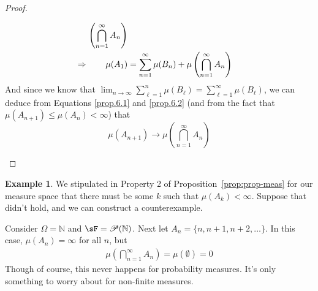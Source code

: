 \documentclass[12pt]{article}
\theoremstyle{plain}
\theoremstyle{definition}
\newtheorem{ex}[thm]{Example}
\theoremstyle{remark}
\begin{document}
\begin{proof}
\begin{enumerate}
\begin{align}
            \left(\bigcap^\infty_{n=1} A_n\right) \notag \\
        \Rightarrow \qquad
            \mu(A_1) &=
            \sum^\infty_{n=1} \mu(B_n) +
            \mu\left(\bigcap^\infty_{n=1} A_n\right)
            \label{prop.6.2}
    \end{align}
    And since we know that $\lim_{n\rightarrow \infty} \sum^n_{\ell=1}
    \mu(B_\ell) = \sum^\infty_{\ell=1} \mu(B_\ell)$, we can deduce from
    Equations \ref{prop.6.1} and \ref{prop.6.2} (and from the fact that
    $\mu(A_{n+1}) \leq \mu(A_n) <\infty$) that
    \[ \mu(A_{n+1})\rightarrow
        \mu\left(\bigcap^\infty_{n=1} A_n\right)
    \]
\end{enumerate}
\end{proof}

\begin{ex}
We stipulated in Property 2 of Proposition~\ref{prop:prop-meas} for our
measure space that there must be some $k$ such that $\mu(A_k)<\infty$.
Suppose that didn't hold, and we can construct a counterexample.

Consider $\Omega = \mathbb{N}$ and $\sF =\mathscr{P}(\mathbb{N})$.
Next let $A_n = \{n, n+1, n+2, \ldots\}$. In this case, $\mu(A_n) =
\infty$ for all $n$, but
\begin{align*}
  \mu\left(\bigcap^\infty_{n=1} A_n\right) =
  \mu(\emptyset) = 0
\end{align*}
Though of course, this never happens for probability measures. It's only
something to worry about for non-finite measures.
\end{ex}
\end{document}
